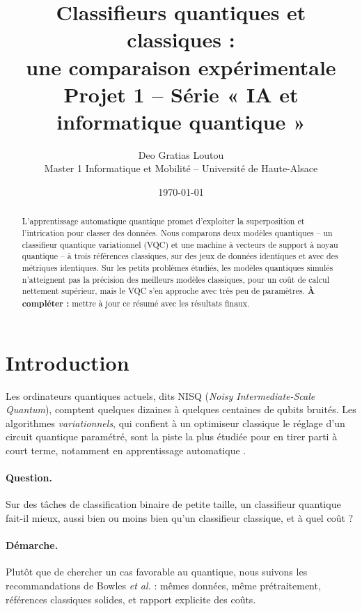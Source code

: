 \documentclass[11pt,a4paper]{article}
\title{\textbf{Classifieurs quantiques et classiques :\\ une comparaison expérimentale}\\[0.4em]
\large Projet 1 -- Série « IA et informatique quantique »}
\author{Deo Gratias Loutou\\ Master 1 Informatique et Mobilité -- Université de Haute-Alsace}
\date{\today}
\newcommand{\afaire}[1]{\textcolor{orange!80!black}{\textbf{À compléter :} #1}}
\begin{document}
\maketitle

\begin{abstract}
L'apprentissage automatique quantique promet d'exploiter la superposition et l'intrication
pour classer des données. Nous comparons deux modèles quantiques -- un classifieur quantique
variationnel (VQC) et une machine à vecteurs de support à noyau quantique -- à trois références
classiques, sur des jeux de données identiques et avec des métriques identiques. Sur les
petits problèmes étudiés, les modèles quantiques simulés n'atteignent pas la précision des
meilleurs modèles classiques, pour un coût de calcul nettement supérieur, mais le VQC s'en
approche avec très peu de paramètres. \afaire{mettre à jour ce résumé avec les résultats finaux.}
\end{abstract}

\tableofcontents
\newpage

\section{Introduction}

Les ordinateurs quantiques actuels, dits NISQ (\emph{Noisy Intermediate-Scale Quantum}),
comptent quelques dizaines à quelques centaines de qubits bruités. Les algorithmes
\emph{variationnels}, qui confient à un optimiseur classique le réglage d'un circuit quantique
paramétré, sont la piste la plus étudiée pour en tirer parti à court terme, notamment en
apprentissage automatique \cite{mitarai2018,schuld2020}.

\paragraph{Question.} Sur des tâches de classification binaire de petite taille, un
classifieur quantique fait-il mieux, aussi bien ou moins bien qu'un classifieur classique,
et à quel coût ?

\paragraph{Démarche.} Plutôt que de chercher un cas favorable au quantique, nous suivons les
recommandations de Bowles \emph{et al.} \cite{bowles2024} : mêmes données, même prétraitement,
références classiques solides, et rapport explicite des coûts.
\end{document}
